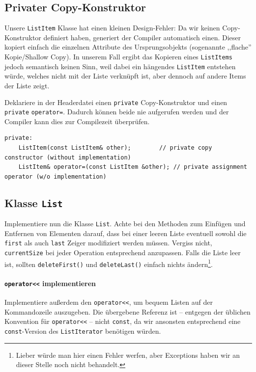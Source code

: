 \subsection{Privater Copy-Konstruktor}
Unsere \texttt{ListItem} Klasse hat einen kleinen Design-Fehler:
Da wir keinen Copy-Konstruktor definiert haben, generiert der Compiler automatisch einen.
Dieser kopiert einfach die einzelnen Attribute des Ursprungsobjekts (sogenannte ,,flache'' Kopie/Shallow Copy).
In unserem Fall ergibt das Kopieren eines \texttt{ListItems} jedoch semantisch keinen Sinn, weil dabei ein hängendes \texttt{ListItem} entstehen würde, welches nicht mit der Liste verknüpft ist, aber dennoch auf andere Items der Liste zeigt.

Deklariere in der Headerdatei einen \texttt{private} Copy-Konstruktor und einen \texttt{private} \texttt{operator=}.
Dadurch können beide nie aufgerufen werden und der Compiler kann dies zur Compilezeit überprüfen.

\begin{lstlisting}
private:
	ListItem(const ListItem& other);		// private copy constructor (without implementation)
	ListItem& operator=(const ListItem &other);	// private assignment operator (w/o implementation)
\end{lstlisting}


\subsection{Klasse \texttt{List}}
Implementiere nun die Klasse \texttt{List}.
Achte bei den Methoden zum Einfügen und Entfernen von Elementen darauf, dass bei einer leeren Liste eventuell sowohl die \texttt{first} als auch \texttt{last} Zeiger modifiziert werden müssen.
Vergiss nicht, \texttt{currentSize} bei jeder Operation entsprechend anzupassen.
Falls die Liste leer ist, sollten \texttt{deleteFirst()} und \texttt{deleteLast()} einfach nichts ändern\footnote{Lieber würde man hier einen Fehler werfen, aber Exceptions haben wir an dieser Stelle noch nicht behandelt.}.

\paragraph{\texttt{operator<<} implementieren}
Implementiere außerdem den \texttt{operator<<}, um bequem Listen auf der Kommandozeile auszugeben.
Die übergebene Referenz ist -- entgegen der üblichen Konvention für \texttt{operator<<} -- nicht \texttt{const}, da wir ansonsten entsprechend eine \texttt{const}-Version des  \texttt{ListIterator} benötigen würden.

